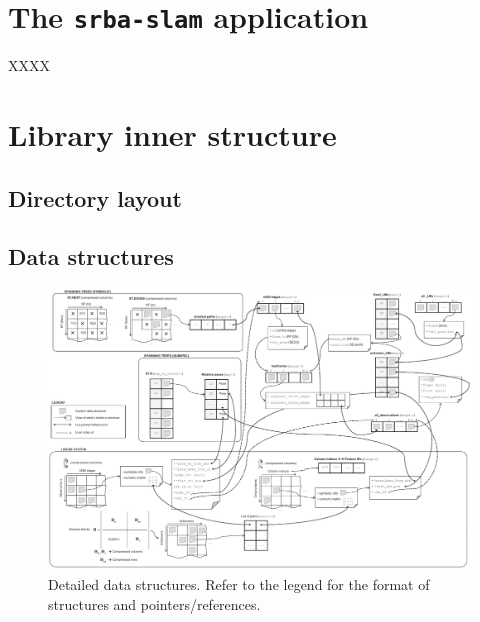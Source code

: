 \documentclass[a4paper,11pt]{article}
\begin{document}
\section{The \texttt{srba-slam} application}
\label{sect:srba_slam_app}

XXXX


\section{Library inner structure}

\subsection{Directory layout}


\subsection{Data structures}


\begin{figure}
\centering
\includegraphics[width=1.0\textwidth]{imgs/srba_data_structures.pdf} 
\caption{Detailed data structures. Refer to the legend for the format of structures and pointers/references.}
\label{fig:detailed.data.structures}
\end{figure}





\newpage


\end{document}
